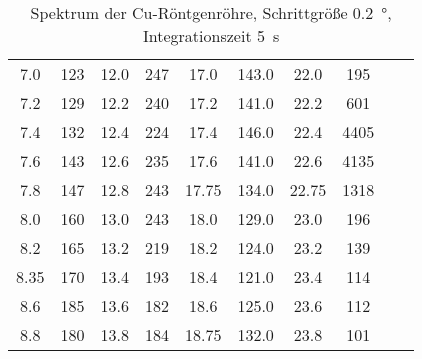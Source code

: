 \begin{table}
\begin{tabular}{S S S S S S S S S S}
        7.0 & 123      & 12.0 & 247          & 17.0 & 143.0         & 22.0 &  195 &  & \\
        7.2 & 129      & 12.2 & 240          & 17.2 & 141.0         & 22.2 &  601 &  & \\
        7.4 & 132      & 12.4 & 224          & 17.4 & 146.0         & 22.4 & 4405 &  & \\
        7.6 & 143      & 12.6 & 235          & 17.6 & 141.0         & 22.6 & 4135 &  & \\
        7.8 & 147      & 12.8 & 243          & 17.75& 134.0         & 22.75& 1318 &  & \\
        8.0 & 160      & 13.0 & 243          & 18.0 & 129.0         & 23.0 &  196 &  & \\
        8.2 & 165      & 13.2 & 219          & 18.2 & 124.0         & 23.2 &  139 &  & \\
        8.35& 170      & 13.4 & 193          & 18.4 & 121.0         & 23.4 &  114 &  & \\
        8.6 & 185      & 13.6 & 182          & 18.6 & 125.0         & 23.6 &  112 &  & \\
        8.8 & 180      & 13.8 & 184          & 18.75& 132.0        & 23.8 &   101 &  & \\
        \bottomrule
    \end{tabular}
    \caption{Spektrum der Cu-Röntgenröhre, Schrittgröße \qty{0.2}{\degree}, Integrationszeit \qty{5}{\s}}
    \label{tab:c02_Cu-Roere_grob}
\end{table}